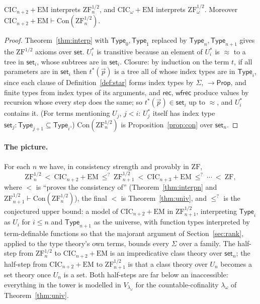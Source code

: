 \documentclass[10pt]{article}
\newcommand{\Prop}{\mathsf{Prop}}
\newcommand{\Type}{\mathsf{Type}}
\newcommand{\CIC}{\mathrm{CIC}}
\newcommand{\ZF}{\mathrm{ZF}}
\newcommand{\ZFh}{\mathrm{ZF}^{1/2}}
\newcommand{\EM}{\mathrm{EM}}
\newcommand{\Con}{\mathrm{Con}}
\newcommand{\rec}{\mathsf{rec}}
\newcommand{\wfrec}{\mathsf{wfrec}}
\begin{document}
\begin{theorem}\label{thm:interpn}
$\CIC_{n+2}+\EM$ interprets $\ZFh_n$, and $\CIC_\omega+\EM$ interprets
$\ZFh_\omega$. Moreover $\CIC_{n+2}+\EM\vdash\Con(\ZFh_n)$.
\end{theorem}
\begin{proof}
Theorem~\ref{thm:interp} with $\Type_0,\Type_1$ replaced by
$\Type_n,\Type_{n+1}$ gives the $\ZFh$ axioms over $\mathsf{set}$. $U_i^*$
is transitive because an element of $U_i^*$ is $\approx$ to a tree in
$\mathsf{set}_i$, whose subtrees are in $\mathsf{set}_i$. Closure: by
induction on the term $t$, if all parameters are in $\mathsf{set}_i$
then $t^*(\vec p)$ is a tree all of whose index types are in $\Type_i$,
since each clause of Definition~\ref{def:star} forms index types by
$\Sigma$, $\to\Prop$, and finite types from index types of its
arguments, and $\rec$, $\wfrec$ produce values by recursion whose every
step does the same; so $t^*(\vec p)\in\mathsf{set}_i$ up to $\approx$,
and $U_i^*$ contains it. (For terms mentioning $U_j$, $j<i$: $U_j^*$
itself has index type $\mathsf{set}_j:\Type_{j+1}\subseteq\Type_i$.)
$\Con(\ZFh_n)$ is Proposition~\ref{prop:con} over $\mathsf{set}_n$.
\end{proof}

\paragraph{The picture.}
For each $n$ we have, in consistency strength and provably in $\ZF$,
\[
\ZFh_n\ <\ \CIC_{n+2}+\EM\ \le^{?}\ \ZFh_{n+1}\ <\ \CIC_{n+3}+\EM\ \le^{?}\ \cdots\ <\ \ZF,
\]
where $<$ is ``proves the consistency of'' (Theorem~\ref{thm:interpn}
and $\ZFh_{n+1}\vdash\Con(\ZFh_n)$), the final $<$ is Theorem~\ref{thm:univ},
and $\le^{?}$ is the conjectured upper bound: a model of $\CIC_{n+2}+\EM$
in $\ZFh_{n+1}$, interpreting $\Type_i$ as $U_i$ for $i\le n$ and
$\Type_{n+1}$ as the universe, with function types interpreted by
term-definable functions so that the majorant argument of
Section~\ref{sec:rank}, applied to the type theory's own terms, bounds
every $\Sigma$ over a family. The half-step from $\ZFh_n$ to
$\CIC_{n+2}+\EM$ is an impredicative class theory over $\mathsf{set}_n$;
the half-step from $\CIC_{n+2}+\EM$ to $\ZFh_{n+1}$ is that a class
theory over $U_n$ becomes a set theory once $U_n$ is a set. Both
half-steps are far below an inaccessible: everything in the tower is
modelled in $V_{\lambda_\omega}$ for the countable-cofinality
$\lambda_\omega$ of Theorem~\ref{thm:univ}.
\end{document}
